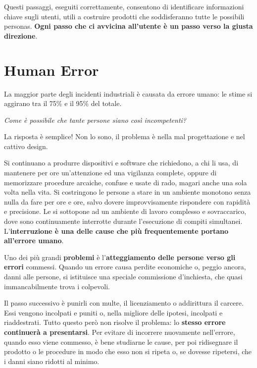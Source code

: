 \documentclass[a4paper,11pt,oneside]{book}
\begin{document}
Questi passaggi, eseguiti correttamente, consentono di identificare informazioni chiave sugli utenti, utili a costruire prodotti che soddisferanno tutte le possibili personas. \textbf{Ogni passo che ci avvicina all'utente è un passo verso la giusta direzione}.

\pagebreak

\chapter{Human Error}

La maggior parte degli incidenti industriali è causata da errore umano:
le stime si aggirano tra il 75\% e il 95\% del totale.

\begin{flushleft}
	\textit{Come è possibile che tante persone siano così incompetenti?}
\end{flushleft}

La risposta è semplice! Non lo sono, il problema è nella mal progettazione e nel cattivo design.

Si continuano a produrre dispositivi e software che richiedono, a chi li usa, di mantenere per ore un'attenzione ed una vigilanza complete, oppure di memorizzare procedure arcaiche, confuse e usate di rado, magari anche una sola volta nella vita. Si costringono le persone a stare in un ambiente monotono senza nulla da fare per ore e ore, salvo dovere improvvisamente rispondere con rapidità e precisione. Le si sottopone ad un ambiente di lavoro complesso e sovraccarico, dove sono continuamente interrotte durante l'esecuzione di compiti simultanei. L'\textbf{interruzione è una delle cause che più frequentemente portano all'errore umano}.

Uno dei più grandi \textbf{problemi} è l'\textbf{atteggiamento delle persone verso gli errori} commessi. Quando un errore causa perdite economiche o, peggio ancora, danni alle persone, si istituisce una speciale commissione d'inchiesta, che quasi immancabilmente trova i colpevoli.

Il passo successivo è punirli con multe, il licenziamento o addirittura il carcere. Essi vengono incolpati
e puniti o, nella migliore delle ipotesi, incolpati e riaddestrati. Tutto questo però non
risolve il problema: lo \textbf{stesso errore continuerà a presentarsi}.  Per evitare di incorrere nuovamente nell'errore, quando esso viene commesso, è bene  studiarne le cause, per poi ridisegnare il prodotto o le procedure in modo che esso non si ripeta o, se dovesse ripetersi, che i danni siano ridotti al minimo.
\end{document}
